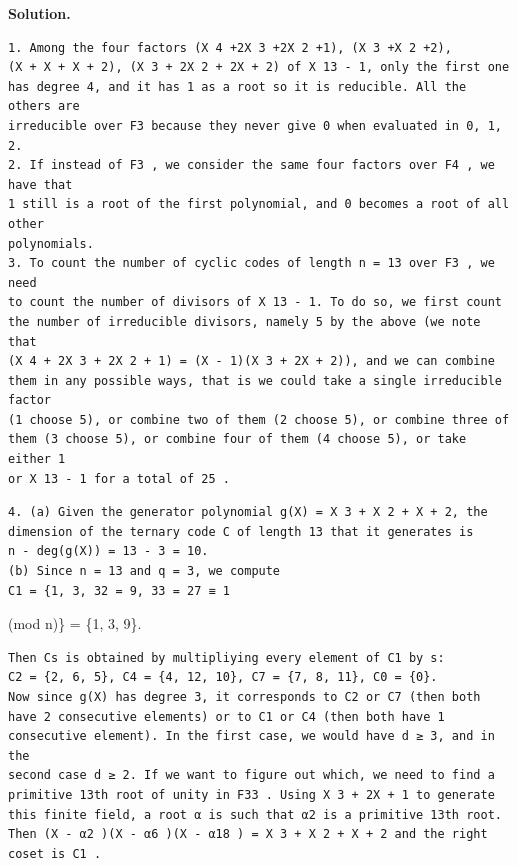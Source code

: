\documentclass[11pt]{article}
\begin{document}
\begin{solutionbox}
\textbf{Solution.}

\begin{Verbatim}[fontsize=\small]
1. Among the four factors (X 4 +2X 3 +2X 2 +1), (X 3 +X 2 +2),
(X + X + X + 2), (X 3 + 2X 2 + 2X + 2) of X 13 - 1, only the first one
has degree 4, and it has 1 as a root so it is reducible. All the others are
irreducible over F3 because they never give 0 when evaluated in 0, 1, 2.
2. If instead of F3 , we consider the same four factors over F4 , we have that
1 still is a root of the first polynomial, and 0 becomes a root of all other
polynomials.
3. To count the number of cyclic codes of length n = 13 over F3 , we need
to count the number of divisors of X 13 - 1. To do so, we first count
the number of irreducible divisors, namely 5 by the above (we note that
(X 4 + 2X 3 + 2X 2 + 1) = (X - 1)(X 3 + 2X + 2)), and we can combine
them in any possible ways, that is we could take a single irreducible factor
(1 choose 5), or combine two of them (2 choose 5), or combine three of
them (3 choose 5), or combine four of them (4 choose 5), or take either 1
or X 13 - 1 for a total of 25 .
\end{Verbatim}
\begin{Verbatim}[fontsize=\small]
4. (a) Given the generator polynomial g(X) = X 3 + X 2 + X + 2, the
dimension of the ternary code C of length 13 that it generates is
n - deg(g(X)) = 13 - 3 = 10.
(b) Since n = 13 and q = 3, we compute
C1 = {1, 3, 32 = 9, 33 = 27 ≡ 1
\end{Verbatim}
(mod n)\} = \{1, 3, 9\}.

\begin{Verbatim}[fontsize=\small]
Then Cs is obtained by multipliying every element of C1 by s:
C2 = {2, 6, 5}, C4 = {4, 12, 10}, C7 = {7, 8, 11}, C0 = {0}.
Now since g(X) has degree 3, it corresponds to C2 or C7 (then both
have 2 consecutive elements) or to C1 or C4 (then both have 1 consecutive element). In the first case, we would have d ≥ 3, and in the
second case d ≥ 2. If we want to figure out which, we need to find a
primitive 13th root of unity in F33 . Using X 3 + 2X + 1 to generate
this finite field, a root α is such that α2 is a primitive 13th root.
Then (X - α2 )(X - α6 )(X - α18 ) = X 3 + X 2 + X + 2 and the right
coset is C1 .
\end{Verbatim}
\end{solutionbox}
\end{document}

